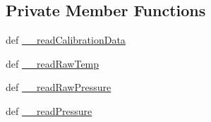 \subsection*{Private Member Functions}
\begin{DoxyCompactItemize}
\item 
def \hyperlink{classlibsensorPy_1_1concretesensor_1_1bmp085Altitude_1_1BMP085Altitude_a5f7f95b5afd6f97cf3e8e19fe5225d1d}{\+\_\+\+\_\+read\+Calibration\+Data}
\item 
def \hyperlink{classlibsensorPy_1_1concretesensor_1_1bmp085Altitude_1_1BMP085Altitude_a91dd29a6b7234a439fa8cbbbf8bde378}{\+\_\+\+\_\+read\+Raw\+Temp}
\item 
def \hyperlink{classlibsensorPy_1_1concretesensor_1_1bmp085Altitude_1_1BMP085Altitude_a3f01b583654e32f0d6411d8a7c50f4a4}{\+\_\+\+\_\+read\+Raw\+Pressure}
\item 
def \hyperlink{classlibsensorPy_1_1concretesensor_1_1bmp085Altitude_1_1BMP085Altitude_a71263888b05c213c173252ce4dfa85e3}{\+\_\+\+\_\+read\+Pressure}
\end{DoxyCompactItemize}
